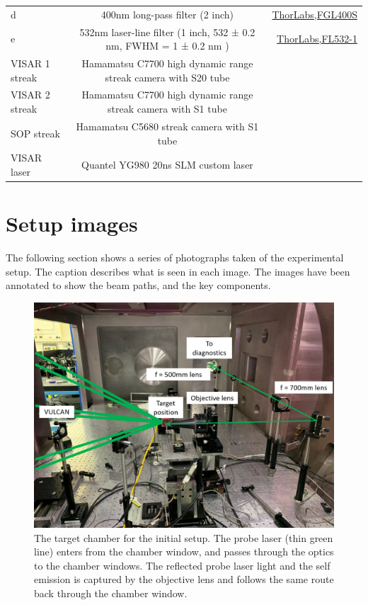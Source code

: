 \begin{landscape}
\begin{table}
\begin{tabular}{lcr}
d & 400nm long-pass filter (2 inch) & \href{https://www.thorlabs.com/thorproduct.cfm?partnumber=FGL400S}{ThorLabs,FGL400S}\\
e & 532nm laser-line filter (1 inch, 532 ± 0.2 nm, FWHM = 1 ± 0.2 nm ) & \href{https://www.thorlabs.com/thorproduct.cfm?partnumber=FL532-1}{ThorLabs,FL532-1}\\
\hline
VISAR 1 streak & Hamamatsu C7700 high dynamic range streak camera with S20 tube &\\
VISAR 2 streak & Hamamatsu C7700 high dynamic range streak camera with S1 tube &\\
SOP streak & Hamamatsu C5680 streak camera with S1 tube & \\
VISAR laser & Quantel YG980 20ns SLM custom laser & \\
\hline\hline
\end{tabular}
\end{table}
\end{landscape}

\section{Setup images}

The following section shows a series of photographs taken of the experimental setup. The caption describes what is seen in each image. The images have been annotated to show the beam paths, and the key components.

\begin{figure}
\begin{centering}
\includegraphics[width=1.0\textwidth]{figures/AppendixExperiment/InitialChamber.png}%
\caption{\label{fig:Appx-InitialChamber} The target chamber for the initial setup. The probe laser (thin green line) enters from the chamber window, and passes through the optics to the chamber windows. The reflected probe laser light and the self emission is captured by the objective lens and follows the same route back through the chamber window.}
\end{centering}
\end{figure}

